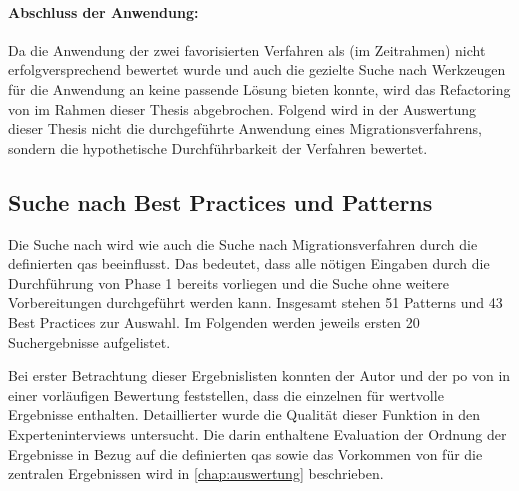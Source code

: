 \paragraph{Abschluss der Anwendung:} Da die Anwendung der zwei favorisierten Verfahren als (im Zeitrahmen) nicht erfolgversprechend bewertet wurde und auch die gezielte Suche nach Werkzeugen für die Anwendung an \jf keine passende Lösung bieten konnte, wird das Refactoring von \jf im Rahmen dieser Thesis abgebrochen.
Folgend wird in der Auswertung dieser Thesis nicht die durchgeführte Anwendung eines Migrationsverfahrens, sondern die hypothetische Durchführbarkeit der Verfahren bewertet.

\subsection{Suche nach Best Practices und Patterns}

Die Suche nach \bpp wird wie auch die Suche nach Migrationsverfahren durch die definierten \glspl{qa} beeinflusst.
Das bedeutet, dass alle nötigen Eingaben durch die Durchführung von Phase 1 bereits vorliegen und die Suche ohne weitere Vorbereitungen durchgeführt werden kann.
Insgesamt stehen 51 Patterns und 43 Best Practices zur Auswahl.
Im Folgenden werden jeweils ersten 20 Suchergebnisse aufgelistet.



Bei erster Betrachtung dieser Ergebnislisten konnten der Autor und der \gls{po} von \jf in einer vorläufigen Bewertung feststellen, dass die einzelnen \bpp für \jf wertvolle Ergebnisse enthalten.
Detaillierter wurde die Qualität dieser Funktion in den Experteninterviews untersucht.
Die darin enthaltene Evaluation der Ordnung der Ergebnisse in Bezug auf die definierten \glspl{qa} sowie das Vorkommen von für die \ff zentralen Ergebnissen wird in \cref{chap:auswertung} beschrieben.


